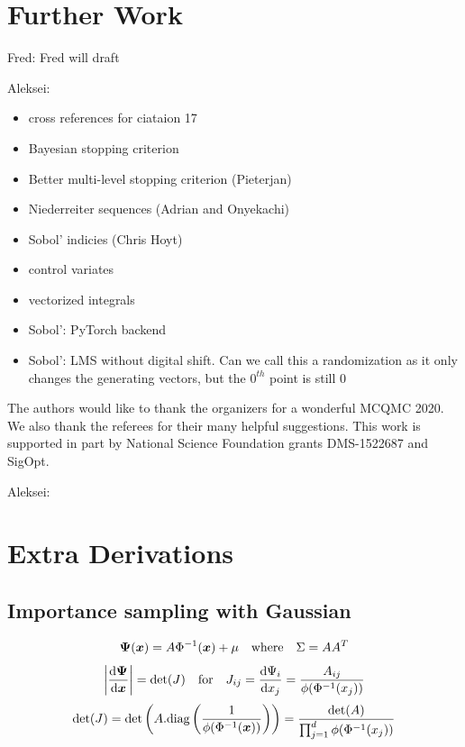 \documentclass[graybox,footinfo]{svmult}
\newcommand{\AGSComment}[1]{{\color{cyan} Aleksei: #1}}
\newcommand{\FJHComment}[1]{{\color{magenta} Fred: #1}}
\begin{document}
\section{Further Work} \label{sec:further} \FJHComment{Fred will draft}

\AGSComment{
\begin{itemize}
    \item cross references for ciataion 17
    \item Bayesian stopping criterion
    \item Better multi-level stopping criterion (Pieterjan)
    \item Niederreiter sequences (Adrian and Onyekachi)
    \item Sobol' indicies (Chris Hoyt)
    \item control variates
    \item vectorized integrals
    \item Sobol': PyTorch  backend
    \item Sobol': LMS without digital shift. Can we call this a randomization as it only changes the generating vectors, but the $0^{th}$ point is still $0$
\end{itemize}}

\begin{acknowledgement}
The authors would like to thank the organizers for a wonderful MCQMC 2020. 
We also thank the referees for their many helpful suggestions.  This work is supported in part by National Science Foundation grants DMS-1522687 and SigOpt.
\end{acknowledgement}





\iffalse
\AGSComment{

\section{Extra Derivations}

\subsection{Importance sampling with Gaussian}

$$ {\boldsymbol{\Psi}}({\boldsymbol{x}}) = A\Phi^{-1}({\boldsymbol{x}}) + \mu \quad \text{where} \quad \Sigma = AA^T$$
$$ \left\lvert \frac{\mathrm{d} {\boldsymbol{\Psi}}}{\mathrm{d} {\boldsymbol{x}}} \right\rvert = \det(J) \quad \text{for} \quad J_{ij} = \frac{\mathrm{d} \Psi_i}{\mathrm{d} x_j} = \frac{A_{ij}}{\phi(\Phi^{-1}(x_j))}$$
$$ \det(J) = \det\left(A . \text{diag}\left(\frac{1}{\phi(\Phi^{-1}({\boldsymbol{x}}))}\right)\right) = \frac{\det(A)}{\prod_{j=1}^d \phi(\Phi^{-1}(x_j))}$$}
\end{document}
